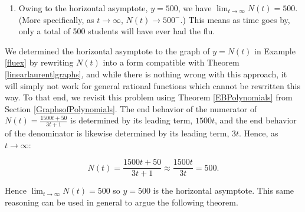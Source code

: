 \documentclass{ximera}
\begin{document}
\begin{example}
\begin{explanation}
\begin{enumerate}
\begin{center}
\end{center}


  
\item  Owing to the horizontal asymptote, $y =500$, we have $\lim_{t \rightarrow \infty} N(t) = 500$. (More specifically, as $t \rightarrow \infty$,  $N(t) \rightarrow 500^{-}$.)  This means as time goes by, only a total of 500 students will have ever had the flu. 

\end{enumerate}
\end{explanation}
\end{example}
 
 We determined the horizontal asymptote to the graph of $y = N(t)$ in Example \ref{fluex} by rewriting $N(t)$ into a form compatible with Theorem  \ref{linearlaurentlgraphs}, and while there is nothing wrong with this approach, it will simply not work for general rational functions which cannot be rewritten this way.  To that end, we revisit this problem using Theorem \ref{EBPolynomials} from Section \ref{GraphsofPolynomials}.  The end behavior of the numerator of $N(t) = \frac{1500t + 50}{3t+1}$ is determined by its leading term,  $1500t$,  and the end behavior of the denominator is likewise determined  by its leading term, $3t$.  Hence, as $t \rightarrow  \infty$:
 
 \[ N(t) = \frac{1500t + 50}{3t+1} \approx \frac{1500t}{3t} = 500.\]
 
Hence $\lim_{t \rightarrow  \infty} N(t) = 500$ so  $y = 500$ is the horizontal asymptote.  This same reasoning can be used in general to argue the following theorem.


\end{document}
